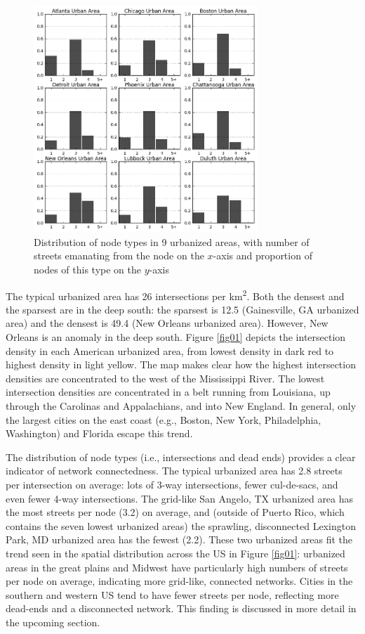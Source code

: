 \documentclass{article}
\begin{document}
\begin{figure}
\includegraphics[width=0.75\textwidth]{media/fig02.png}
\caption{Distribution of node types in 9 urbanized areas, with number of streets emanating from the node on the $x$-axis and proportion of nodes of this type on the $y$-axis }
\label{fig02}
\end{figure}

The typical urbanized area has 26 intersections per km\textsuperscript{2}. Both the densest and the sparsest are in the deep south: the sparsest is 12.5 (Gainesville, GA urbanized area) and the densest is 49.4 (New Orleans urbanized area). However, New Orleans is an anomaly in the deep south. Figure \ref{fig01} depicts the intersection density in each American urbanized area, from lowest density in dark red to highest density in light yellow. The map makes clear how the highest intersection densities are concentrated to the west of the Mississippi River. The lowest intersection densities are concentrated in a belt running from Louisiana, up through the Carolinas and Appalachians, and into New England. In general, only the largest cities on the east coast (e.g., Boston, New York, Philadelphia, Washington) and Florida escape this trend.

The distribution of node types (i.e., intersections and dead ends) provides a clear indicator of network connectedness. The typical urbanized area has 2.8 streets per intersection on average: lots of 3-way intersections, fewer cul-de-sacs, and even fewer 4-way intersections. The grid-like San Angelo, TX urbanized area has the most streets per node (3.2) on average, and (outside of Puerto Rico, which contains the seven lowest urbanized areas) the sprawling, disconnected Lexington Park, MD urbanized area has the fewest (2.2). These two urbanized areas fit the trend seen in the spatial distribution across the US in Figure \ref{fig01}: urbanized areas in the great plains and Midwest have particularly high numbers of streets per node on average, indicating more grid-like, connected networks. Cities in the southern and western US tend to have fewer streets per node, reflecting more dead-ends and a disconnected network. This finding is discussed in more detail in the upcoming section.
\end{document}
